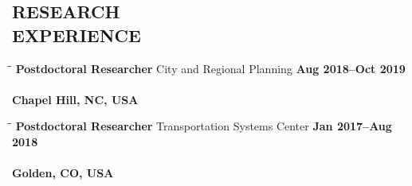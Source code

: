 \documentclass[margin,line]{resume}
\begin{document}
\begin{resume}

    \section{\mysidestyle \bf RESEARCH\\EXPERIENCE}

    \vspace{-0.1in}
    
     \begin{tabbing}
   \hspace{2.0in}\= \hspace{2.6in}\= \kill%
    {\bf Postdoctoral Researcher} \>   City and Regional Planning   \> \bf Aug 2018--Oct 2019 \\
                       \\ \> Chapel Hill, NC, USA
   \end{tabbing}\vspace{-20pt}



     \begin{tabbing}
   \hspace{2.0in}\= \hspace{2.6in}\= \kill %
    {\bf Postdoctoral Researcher} \>  Transportation Systems Center \> \bf Jan 2017--Aug 2018\\
                           \\ \> Golden, CO, USA
   \end{tabbing}\vspace{-20pt}


\end{resume}
\end{document}
